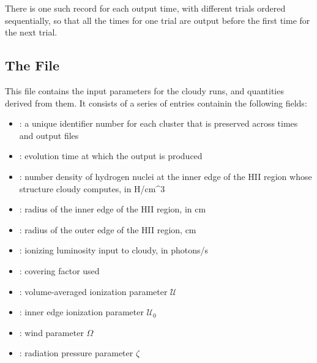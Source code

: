 \documentclass[letterpaper,10pt,english]{sphinxmanual}
\begin{document}
There is one such record for each output time, with different trials
ordered sequentially, so that all the times for one trial are output
before the first time for the next trial.


\subsection{The  File}
\label{\detokenize{cloudy:the-cluster-cloudyparams-file}}
This file contains the input parameters for the cloudy runs, and
quantities derived from them. It consists of a series of entries
containin the following fields:
\begin{itemize}
\item {} 
: a unique identifier number for each cluster that is
preserved across times and output files

\item {} 
: evolution time at which the output is produced

\item {} 
: number density of hydrogen nuclei at the inner edge of the
HII region whose structure cloudy computes, in H/cm\textasciicircum{}3

\item {} 
: radius of the inner edge of the HII region, in cm

\item {} 
: radius of the outer edge of the HII region, cm

\item {} 
: ionizing luminosity input to cloudy, in photons/s

\item {} 
: covering factor used

\item {} 
: volume-averaged ionization parameter \(\mathcal{U}\)

\item {} 
: inner edge ionization parameter \(\mathcal{U}_0\)

\item {} 
: wind parameter \(\Omega\)

\item {} 
: radiation pressure parameter \(\zeta\)

\end{itemize}
\end{document}
